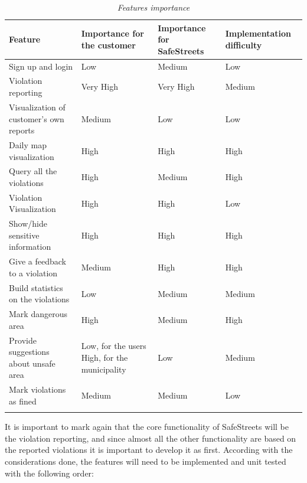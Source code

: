 \documentclass[../RASD.tex]{subfiles}
\begin{document}
    \begin{center}
        \begin{longtable}{| p{.25\linewidth} | p{.25\linewidth} | p{.25\linewidth} | p{.25\linewidth} |}

            \hline
            \textbf{Feature} & \textbf{Importance for the customer} & \textbf{Importance for SafeStreets} & \textbf{Implementation difficulty} \\ \hline
            Sign up and login & Low & Medium & Low\\ \hline
            Violation reporting & Very High & Very High & Medium\\ \hline
            Visualization of customer’s own reports & Medium & Low & Low\\ \hline
            Daily map visualization & High & High & High\\ \hline
            Query all the violations & High & Medium & High\\ \hline
            Violation Visualization & High & High & Low\\ \hline
            Show/hide sensitive information & High & High & High\\ \hline
            Give a feedback to a violation & Medium & High & High\\ \hline
            Build statistics on the violations & Low & Medium & Medium\\ \hline
            Mark dangerous area & High & Medium & High\\ \hline
            Provide suggestions about unsafe area & Low, for the users High, for the municipality & Low & Medium\\ \hline
            Mark violations as fined & Medium & Medium & Low\\ \hline
            \caption[\textit{Features importance}]{\textit{Features importance}}
        \end{longtable}
    \end{center}
    It is important to mark again that the core functionality of SafeStreets will be the violation reporting,
    and since almost all the other functionality are based on the reported violations it is important to develop it as first.
    According with the considerations done, the features will need to be implemented and unit tested with the following order:
\end{document}
